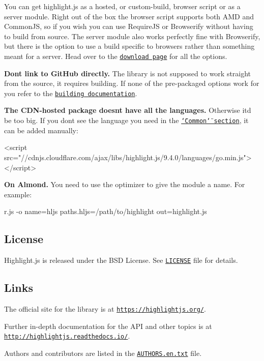 You can get highlight.\+js as a hosted, or custom-\/build, browser script or as a server module. Right out of the box the browser script supports both A\+MD and Common\+JS, so if you wish you can use Require\+JS or Browserify without having to build from source. The server module also works perfectly fine with Browserify, but there is the option to use a build specific to browsers rather than something meant for a server. Head over to the \href{https://highlightjs.org/download/}{\tt download page} for all the options.

{\bfseries Don\textquotesingle{}t link to Git\+Hub directly.} The library is not supposed to work straight from the source, it requires building. If none of the pre-\/packaged options work for you refer to the \href{http://highlightjs.readthedocs.io/en/latest/building-testing.html}{\tt building documentation}.

{\bfseries The C\+D\+N-\/hosted package doesn\textquotesingle{}t have all the languages.} Otherwise it\textquotesingle{}d be too big. If you don\textquotesingle{}t see the language you need in the \href{https://highlightjs.org/download/}{\tt \char`\"{}\+Common\char`\"{} section}, it can be added manually\+:


\begin{DoxyCode}
<script src="//cdnjs.cloudflare.com/ajax/libs/highlight.js/9.4.0/languages/go.min.js"></script>
\end{DoxyCode}


{\bfseries On Almond.} You need to use the optimizer to give the module a name. For example\+:


\begin{DoxyCode}
r.js -o name=hljs paths.hljs=/path/to/highlight out=highlight.js
\end{DoxyCode}


\subsection*{License}

Highlight.\+js is released under the B\+SD License. See \href{https://github.com/isagalaev/highlight.js/blob/master/LICENSE}{\tt L\+I\+C\+E\+N\+SE} file for details.

\subsection*{Links}

The official site for the library is at \href{https://highlightjs.org/}{\tt https\+://highlightjs.\+org/}.

Further in-\/depth documentation for the A\+PI and other topics is at \href{http://highlightjs.readthedocs.io/}{\tt http\+://highlightjs.\+readthedocs.\+io/}.

Authors and contributors are listed in the \href{https://github.com/isagalaev/highlight.js/blob/master/AUTHORS.en.txt}{\tt A\+U\+T\+H\+O\+R\+S.\+en.\+txt} file. 